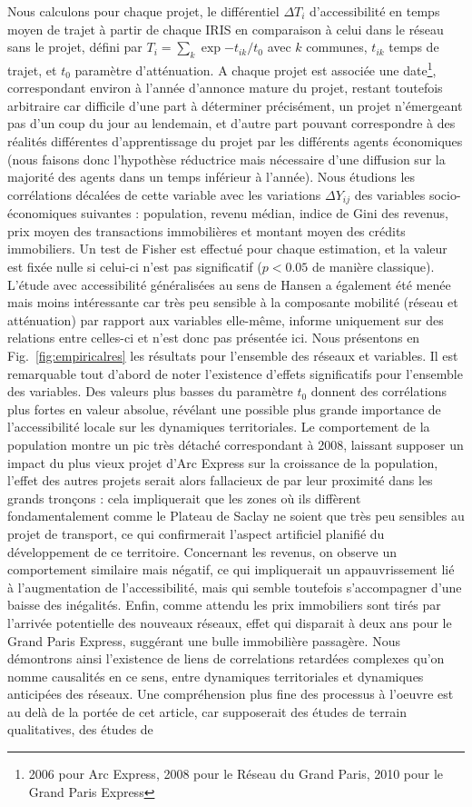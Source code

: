 \documentclass[french]{./sageo}
\begin{document}
Nous calculons pour chaque projet, le différentiel $\Delta T_i$ d'accessibilité en temps moyen de trajet à partir de chaque IRIS en comparaison à celui dans le réseau sans le projet, défini par $T_i = \sum_k \exp{-t_{ik}/t_0}$ avec $k$ communes, $t_{ik}$ temps de trajet, et $t_0$ paramètre d'atténuation. A chaque projet est associée une date\footnote{2006 pour Arc Express, 2008 pour le Réseau du Grand Paris, 2010 pour le Grand Paris Express}, correspondant environ à l'année d'annonce mature du projet, restant toutefois arbitraire car difficile d'une part à déterminer précisément, un projet n'émergeant pas d'un coup du jour au lendemain, et d'autre part pouvant correspondre à des réalités différentes d'apprentissage du projet par les différents agents économiques (nous faisons donc l'hypothèse réductrice mais nécessaire d'une diffusion sur la majorité des agents dans un temps inférieur à l'année). Nous étudions les corrélations décalées de cette variable avec les variations $\Delta Y_{ij}$ des variables socio-économiques suivantes : population, revenu médian, indice de Gini des revenus, prix moyen des transactions immobilières et montant moyen des crédits immobiliers. Un test de Fisher est effectué pour chaque estimation, et la valeur est fixée nulle si celui-ci n'est pas significatif ($p<0.05$ de manière classique). L'étude avec accessibilité généralisées au sens de Hansen a également été menée mais moins intéressante car très peu sensible à la composante mobilité (réseau et atténuation) par rapport aux variables elle-même, informe uniquement sur des relations entre celles-ci et n'est donc pas présentée ici. Nous présentons en Fig.~\ref{fig:empiricalres} les résultats pour l'ensemble des réseaux et variables. Il est remarquable tout d'abord de noter l'existence d'effets significatifs pour l'ensemble des variables. Des valeurs plus basses du paramètre $t_0$ donnent des corrélations plus fortes en valeur absolue, révélant une possible plus grande importance de l'accessibilité locale sur les dynamiques territoriales. Le comportement de la population montre un pic très détaché correspondant à 2008, laissant supposer un impact du plus vieux projet d'Arc Express sur la croissance de la population, l'effet des autres projets serait alors fallacieux de par leur proximité dans les grands tronçons : cela impliquerait que les zones où ils diffèrent fondamentalement comme le Plateau de Saclay ne soient que très peu sensibles au projet de transport, ce qui confirmerait l'aspect artificiel planifié du développement de ce territoire. Concernant les revenus, on observe un comportement similaire mais négatif, ce qui impliquerait un appauvrissement lié à l'augmentation de l'accessibilité, mais qui semble toutefois s'accompagner d'une baisse des inégalités. Enfin, comme attendu les prix immobiliers sont tirés par l'arrivée potentielle des nouveaux réseaux, effet qui disparait à deux ans pour le Grand Paris Express, suggérant une bulle immobilière passagère. Nous démontrons ainsi l'existence de liens de correlations retardées complexes qu'on nomme causalités en ce sens, entre dynamiques territoriales et dynamiques anticipées des réseaux. Une compréhension plus fine des processus à l'oeuvre est au delà de la portée de cet article, car supposerait des études de terrain qualitatives, des études de 
\end{document}
